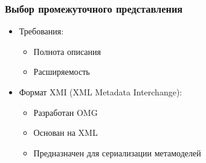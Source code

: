 \documentclass{beamer}
\begin{document}
\begin{frame}
\frametitle{Выбор промежуточного представления}

\begin{itemize}
    \item Требования:
    \begin{itemize}
        \item Полнота описания
        \item Расширяемость
    \end{itemize}

    \item Формат XMI (XML Metadata Interchange):
    \begin{itemize}
        \item Разработан OMG
        \item Основан на XML
        \item Предназначен для сериализации метамоделей
    \end{itemize}
\end{itemize}

\end{frame}
\end{document}
